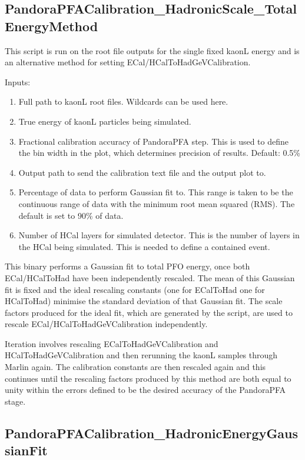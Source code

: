 \documentclass[11pt, oneside]{article}   	%
\begin{document}
\subsection{PandoraPFACalibration\_HadronicScale\_TotalEnergyMethod}

This script is run on the root file outputs for the single fixed kaonL energy and is an alternative method for setting ECal/HCalToHadGeVCalibration.

Inputs:
\begin{enumerate}
\item Full path to kaonL root files.  Wildcards can be used here.
\item True energy of kaonL particles being simulated.
\item Fractional calibration accuracy of PandoraPFA step.  This is used to define the bin width in the plot, which determines precision of results.  Default: 0.5\%
\item Output path to send the calibration text file and the output plot to.
\item Percentage of data to perform Gaussian fit to.  This range is taken to be the continuous range of data with the minimum root mean squared (RMS).  The default is set to 90\% of data.
\item Number of HCal layers for simulated detector.  This is the number of layers in the HCal being simulated.  This is needed to define a contained event.
\end{enumerate}

This binary performs a Gaussian fit to total PFO energy, once both ECal/HCalToHad have been independently rescaled.  The mean of this Gaussian fit is fixed and the ideal rescaling constants (one for ECalToHad one for HCalToHad) minimise the standard deviation of that Gaussian fit.  The scale factors produced for the ideal fit, which are generated by the script, are used to rescale ECal/HCalToHadGeVCalibration independently.

Iteration involves rescaling ECalToHadGeVCalibration and HCalToHadGeVCalibration and then rerunning the kaonL samples through Marlin again.  The calibration constants are then rescaled again and this continues until the rescaling factors produced by this method are both equal to unity within the errors defined to be the desired accuracy of the PandoraPFA stage.  

\subsection{PandoraPFACalibration\_HadronicEnergyGaussianFit}
\end{document}
